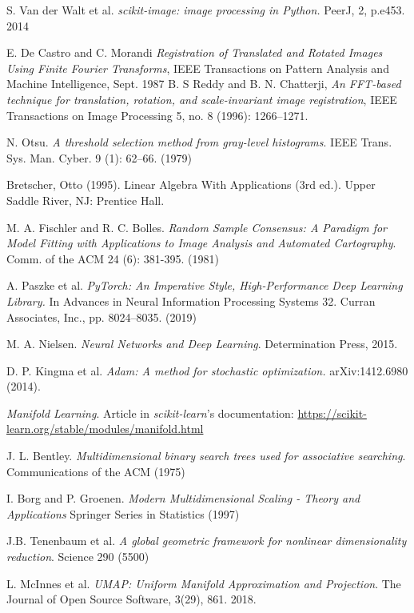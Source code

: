 \documentclass[11pt, a4paper, twoside]{article} %
\begin{document}
\begin{thebibliography}{1}
{
S. Van der Walt et al. {\em scikit-image: image processing in Python.} PeerJ, 2, p.e453. 2014

E. De Castro and C. Morandi {\em Registration of Translated and Rotated Images Using Finite Fourier Transforms}, IEEE Transactions on Pattern Analysis and Machine Intelligence, Sept. 1987
 B. S Reddy and B. N. Chatterji, {\em An FFT-based technique for translation, rotation, and scale-invariant image registration}, IEEE Transactions on Image Processing 5, no. 8 (1996): 1266–1271.
 
N. Otsu. {\em A threshold selection method from gray-level histograms}. IEEE Trans. Sys. Man. Cyber. 9 (1): 62–66. (1979)

Bretscher, Otto (1995). Linear Algebra With Applications (3rd ed.). Upper Saddle River, NJ: Prentice Hall.


M. A. Fischler and R. C. Bolles. {\em Random Sample Consensus: A Paradigm for Model Fitting with Applications to Image Analysis and Automated Cartography}. Comm. of the ACM 24 (6): 381-395. (1981)

A. Paszke et al. {\em PyTorch: An Imperative Style, High-Performance Deep Learning Library.} In Advances in Neural Information Processing Systems 32. Curran Associates, Inc., pp. 8024–8035. (2019)

M. A. Nielsen. {\em Neural Networks and Deep Learning}. Determination Press, 2015.

D. P. Kingma et al. {\em Adam: A method for stochastic optimization.} arXiv:1412.6980 (2014).

{\em Manifold Learning}. Article in {\em scikit-learn}'s documentation: \href{https://scikit-learn.org/stable/modules/manifold.html}{https://scikit-learn.org/stable/modules/manifold.html}

J. L. Bentley. {\em Multidimensional binary search trees used for associative searching}. Communications of the ACM (1975)

I. Borg and P. Groenen. {\em Modern Multidimensional Scaling - Theory and Applications} Springer Series in Statistics (1997)

J.B. Tenenbaum et al. {\em A global geometric framework for nonlinear dimensionality reduction}.  Science 290 (5500)


L. McInnes et al. {\em UMAP: Uniform Manifold Approximation and Projection}. The Journal of Open Source Software, 3(29), 861. 2018.

}
\end{thebibliography}
\end{document}
